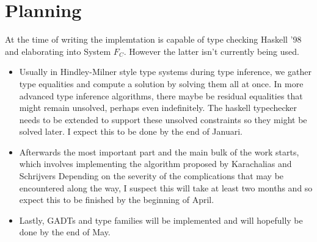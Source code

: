 \section{Planning}
At the time of writing the implemtation is capable of type checking Haskell '98
and elaborating into System $F_C$. However the latter isn't currently being
used.

\begin{itemize}
    \item Usually in Hindley-Milner style type systems during type inference, we
        gather type equalities and compute a solution by solving them all at
        once. In more advanced type inference algorithms, there maybe be
        residual equalities that might remain unsolved, perhaps even
        indefinitely. The haskell typechecker needs to be extended to support
        these unsolved constraints so they might be solved later. I expect this
        to be done by the end of Januari.
    \item Afterwards the most important part and the main bulk of the work
        starts, which involves implementing the algorithm proposed by
        Karachalias and Schrijvers \cite{Karachalias:2017:EFD:3156695.3122966}
        Depending on the severity of the complications that may be encountered
        along the way, I suspect this will take at least two months and so
        expect this to be finished by the beginning of April.
    \item Lastly, GADTs and type families will be implemented and will hopefully
        be done by the end of May.
\end{itemize}

